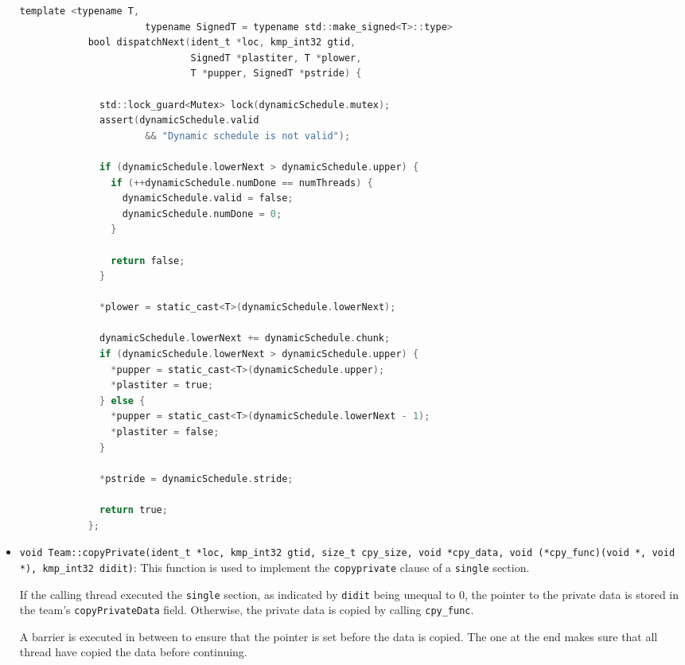 \begin{itemize}
	      \begin{lstlisting}[language=C, caption={void Team::dispatchNext},
          label={lst:team-dispatchnext}, escapechar=@]
            template <typename T,
                      typename SignedT = typename std::make_signed<T>::type>
            bool dispatchNext(ident_t *loc, kmp_int32 gtid,
                              SignedT *plastiter, T *plower,
                              T *pupper, SignedT *pstride) {

              std::lock_guard<Mutex> lock(dynamicSchedule.mutex);
              assert(dynamicSchedule.valid
                      && "Dynamic schedule is not valid");

              if (dynamicSchedule.lowerNext > dynamicSchedule.upper) {
                if (++dynamicSchedule.numDone == numThreads) {
                  dynamicSchedule.valid = false;
                  dynamicSchedule.numDone = 0;
                }

                return false;
              }

              *plower = static_cast<T>(dynamicSchedule.lowerNext);

              dynamicSchedule.lowerNext += dynamicSchedule.chunk;
              if (dynamicSchedule.lowerNext > dynamicSchedule.upper) {
                *pupper = static_cast<T>(dynamicSchedule.upper);
                *plastiter = true;
              } else {
                *pupper = static_cast<T>(dynamicSchedule.lowerNext - 1);
                *plastiter = false;
              }

              *pstride = dynamicSchedule.stride;

              return true;
            };
          \end{lstlisting}

	\item \texttt{void Team::copyPrivate(ident_t *loc, kmp_int32 gtid, size_t cpy_size, void
		      *cpy_data, void (*cpy_func)(void *, void *), kmp_int32 didit)}: This function is used to
	      implement the \texttt{copyprivate} clause of a  \texttt{single} section.

	      If the calling thread executed the \texttt{single} section, as indicated by \texttt{didit}
	      being unequal to 0, the pointer to the private data is stored in the team's \texttt{copyPrivateData}
	      field. Otherwise, the private data is copied by calling \texttt{cpy\_func}.

	      A barrier is executed in between to ensure that the pointer is set before the data is
	      copied. The one at the end makes sure that all thread have copied the data before
	      continuing.


\end{itemize}
